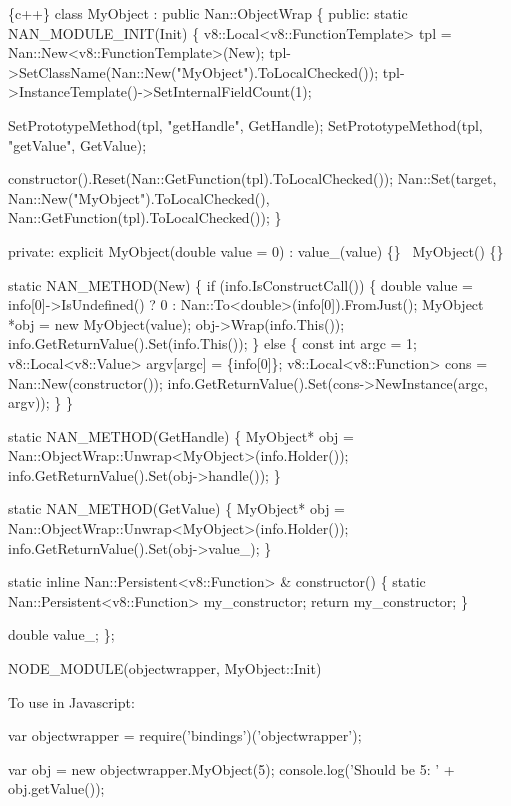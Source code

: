 \begin{DoxyCode}
\{c++\}
class MyObject : public Nan::ObjectWrap \{
 public:
  static NAN\_MODULE\_INIT(Init) \{
    v8::Local<v8::FunctionTemplate> tpl = Nan::New<v8::FunctionTemplate>(New);
    tpl->SetClassName(Nan::New("MyObject").ToLocalChecked());
    tpl->InstanceTemplate()->SetInternalFieldCount(1);

    SetPrototypeMethod(tpl, "getHandle", GetHandle);
    SetPrototypeMethod(tpl, "getValue", GetValue);

    constructor().Reset(Nan::GetFunction(tpl).ToLocalChecked());
    Nan::Set(target, Nan::New("MyObject").ToLocalChecked(),
      Nan::GetFunction(tpl).ToLocalChecked());
  \}

 private:
  explicit MyObject(double value = 0) : value\_(value) \{\}
  ~MyObject() \{\}

  static NAN\_METHOD(New) \{
    if (info.IsConstructCall()) \{
      double value = info[0]->IsUndefined() ? 0 : Nan::To<double>(info[0]).FromJust();
      MyObject *obj = new MyObject(value);
      obj->Wrap(info.This());
      info.GetReturnValue().Set(info.This());
    \} else \{
      const int argc = 1;
      v8::Local<v8::Value> argv[argc] = \{info[0]\};
      v8::Local<v8::Function> cons = Nan::New(constructor());
      info.GetReturnValue().Set(cons->NewInstance(argc, argv));
    \}
  \}

  static NAN\_METHOD(GetHandle) \{
    MyObject* obj = Nan::ObjectWrap::Unwrap<MyObject>(info.Holder());
    info.GetReturnValue().Set(obj->handle());
  \}

  static NAN\_METHOD(GetValue) \{
    MyObject* obj = Nan::ObjectWrap::Unwrap<MyObject>(info.Holder());
    info.GetReturnValue().Set(obj->value\_);
  \}

  static inline Nan::Persistent<v8::Function> & constructor() \{
    static Nan::Persistent<v8::Function> my\_constructor;
    return my\_constructor;
  \}

  double value\_;
\};

NODE\_MODULE(objectwrapper, MyObject::Init)
\end{DoxyCode}


To use in Javascript\+:


\begin{DoxyCode}
var objectwrapper = require('bindings')('objectwrapper');

var obj = new objectwrapper.MyObject(5);
console.log('Should be 5: ' + obj.getValue());
\end{DoxyCode}


